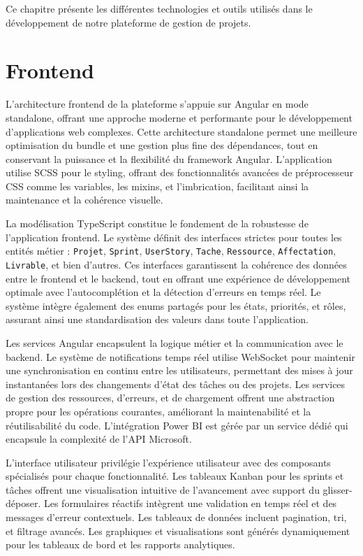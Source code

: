 Ce chapitre présente les différentes technologies et outils utilisés dans le développement de notre plateforme de gestion de projets.

\section{Frontend}

L'architecture frontend de la plateforme s'appuie sur Angular \cite{google2023} en mode standalone, offrant une approche moderne et performante pour le développement d'applications web complexes. Cette architecture standalone permet une meilleure optimisation du bundle et une gestion plus fine des dépendances, tout en conservant la puissance et la flexibilité du framework Angular. L'application utilise SCSS pour le styling, offrant des fonctionnalités avancées de préprocesseur CSS comme les variables, les mixins, et l'imbrication, facilitant ainsi la maintenance et la cohérence visuelle.

La modélisation TypeScript constitue le fondement de la robustesse de l'application frontend. Le système définit des interfaces strictes pour toutes les entités métier : \texttt{Projet}, \texttt{Sprint}, \texttt{UserStory}, \texttt{Tache}, \texttt{Ressource}, \texttt{Affectation}, \texttt{Livrable}, et bien d'autres. Ces interfaces garantissent la cohérence des données entre le frontend et le backend, tout en offrant une expérience de développement optimale avec l'autocomplétion et la détection d'erreurs en temps réel. Le système intègre également des enums partagés pour les états, priorités, et rôles, assurant ainsi une standardisation des valeurs dans toute l'application.

Les services Angular encapsulent la logique métier et la communication avec le backend. Le système de notifications temps réel utilise WebSocket pour maintenir une synchronisation en continu entre les utilisateurs, permettant des mises à jour instantanées lors des changements d'état des tâches ou des projets. Les services de gestion des ressources, d'erreurs, et de chargement offrent une abstraction propre pour les opérations courantes, améliorant la maintenabilité et la réutilisabilité du code. L'intégration Power BI est gérée par un service dédié qui encapsule la complexité de l'API Microsoft.

L'interface utilisateur privilégie l'expérience utilisateur avec des composants spécialisés pour chaque fonctionnalité. Les tableaux Kanban pour les sprints et tâches offrent une visualisation intuitive de l'avancement avec support du glisser-déposer. Les formulaires réactifs intègrent une validation en temps réel et des messages d'erreur contextuels. Les tableaux de données incluent pagination, tri, et filtrage avancés. Les graphiques et visualisations sont générés dynamiquement pour les tableaux de bord et les rapports analytiques.

